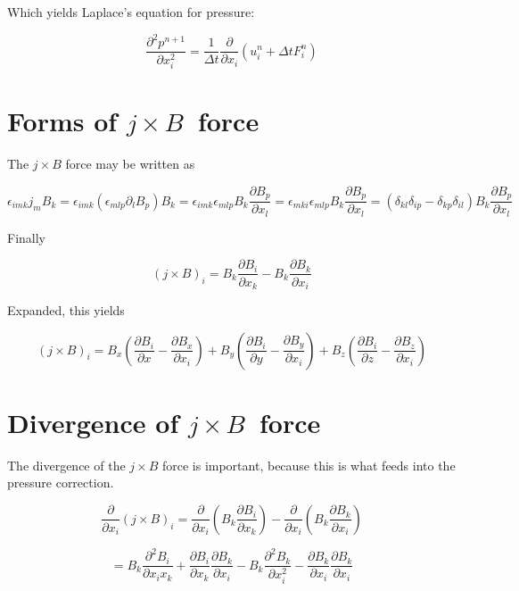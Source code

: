 \documentclass[11pt]{article}
\begin{document}
Which yields Laplace's equation for pressure:

\begin{equation}
	\frac{\partial^2 p^{n+1}}{\partial x_i^2}
	=
	\frac{1}{\Delta t}
	\frac{\partial }{\partial x_i}
	\left(
	u_i^n
	+
	\Delta t
	F_i^n
	\right)
\end{equation}

\section{Forms of \texorpdfstring{$j \times B$} \ \ force}

The $j \times B$ force may be written as

\begin{equation}
	\epsilon_{imk} j_m B_k
	=
	\epsilon_{imk} (\epsilon_{mlp} \partial_l B_p) B_k
	=
	\epsilon_{imk} \epsilon_{mlp} B_k \frac{\partial B_p}{\partial x_l} 
	=
	\epsilon_{mki} \epsilon_{mlp} B_k \frac{\partial B_p}{\partial x_l} 
	=
	(\delta_{kl} \delta_{ip}
	-
	\delta_{kp} \delta_{il}) 
	B_k \frac{\partial B_p}{\partial x_l} 
\end{equation}

Finally

\begin{equation}
	(j \times B )_i
	=
	B_k \frac{\partial B_i}{\partial x_k} 
	-
	B_k \frac{\partial B_k}{\partial x_i} 
\end{equation}

Expanded, this yields

\begin{equation}
	(j \times B )_i
	=
	B_x
	\left(
	\frac{\partial B_i}{\partial x} 
	- 
	\frac{\partial B_x}{\partial x_i} 
	\right)
	+
	B_y
	\left(
	\frac{\partial B_i}{\partial y} 
	- 
	\frac{\partial B_y}{\partial x_i} 
	\right)
	+
	B_z
	\left(
	\frac{\partial B_i}{\partial z} 
	- 
	\frac{\partial B_z}{\partial x_i} 
	\right)
\end{equation}



\section{Divergence of \texorpdfstring{$j \times B$} \ \ force}

The divergence of the $j \times B$ force is important, because this is what feeds into the pressure correction.

\begin{equation}
	\frac{\partial }{\partial x_i}
	(j \times B )_i
	=
	\frac{\partial }{\partial x_i}
	\left(
	B_k 
	\frac{\partial B_i}{\partial x_k} 
	\right)
	-
	\frac{\partial }{\partial x_i}
	\left(
	B_k 
	\frac{\partial B_k}{\partial x_i} 
	\right)
\end{equation}


\begin{equation}
	=
	B_k 
	\frac{\partial^2 B_i}{\partial x_i x_k} 
	+
	\frac{\partial B_i}{\partial x_k} 
	\frac{\partial B_k}{\partial x_i}
	-
	B_k 
	\frac{\partial^2 B_k}{\partial x_i^2} 
	-
	\frac{\partial B_k}{\partial x_i} 
	\frac{\partial B_k}{\partial x_i}
\end{equation}
\end{document}
